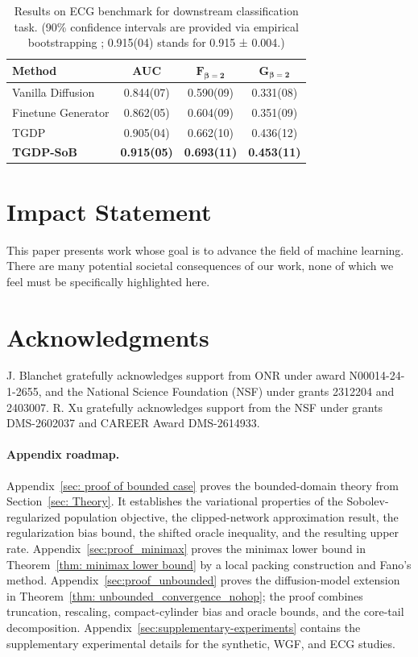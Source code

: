 \documentclass[11pt]{article}
\theoremstyle{plain}
\theoremstyle{definition}
\theoremstyle{remark}
\begin{document}
\begin{table}[htbp]
\centering\small
\begin{tabular}{l|c|c|c}
\hline
\textbf{Method} & \textbf{AUC} & $\mathbf{F_{\beta=2}}$ & $\mathbf{G_{\beta=2}}$ \\
\hline
\hline
Vanilla Diffusion    & 0.844(07) & 0.590(09) & 0.331(08) \\
Finetune Generator   & 0.862(05) & 0.604(09) & 0.351(09) \\
TGDP        & 0.905(04) & 0.662(10) & 0.436(12) \\
\textbf{TGDP-SoB} & \textbf{0.915(05)}& \textbf{0.693(11)} & \textbf{0.453(11)} \\
\hline
\end{tabular}
\caption{Results on ECG benchmark for  downstream classification task. (90\% confidence intervals are provided via empirical bootstrapping  \cite{strodthoff2020deep}; 0.915(04) stands for 0.915 ± 0.004.)}\label{table: downstream}
\end{table}

\section*{Impact Statement}
This paper presents work whose goal is to advance the field of machine learning. There are many potential societal consequences of our work, none of which we feel must be specifically highlighted here.

\section*{Acknowledgments}
J. Blanchet gratefully acknowledges support from ONR under award N00014-24-1-2655, and the National Science Foundation (NSF) under grants 2312204 and 2403007. R. Xu gratefully acknowledges support from the NSF under grants DMS-2602037 and CAREER Award DMS-2614933.





\newpage
\appendix
\paragraph{Appendix roadmap.}
Appendix~\ref{sec: proof of bounded case} proves the bounded-domain theory
from Section~\ref{sec: Theory}. It establishes the variational properties of
the Sobolev-regularized population objective, the clipped-network
approximation result, the regularization bias bound, the shifted oracle
inequality, and the resulting upper rate. Appendix~\ref{sec:proof_minimax}
proves the minimax lower bound in Theorem~\ref{thm: minimax lower bound} by a
local packing construction and Fano's method. Appendix~\ref{sec:proof_unbounded}
proves the diffusion-model extension in
Theorem~\ref{thm: unbounded_convergence_nohop}; the proof combines
truncation, rescaling, compact-cylinder bias and oracle bounds, and the
core-tail decomposition. Appendix~\ref{sec:supplementary-experiments}
contains the supplementary experimental details for the synthetic, WGF, and
ECG studies.
\end{document}

